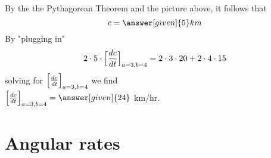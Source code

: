 \documentclass{ximera}
\begin{document}
\begin{example}
\begin{explanation}
\begin{image}
\end{image}
By the the Pythagorean Theorem and the picture above, it follows that
\[
c = \answer[given]{5}  km
\]
By  "plugging in" 
\[
2\cdot 5 \cdot \Bigl[\frac{dc}{dt}\Bigr]_{a=3, b=4} = 2 \cdot 3\cdot 20 + 2 \cdot 4 \cdot 15
\]
solving for $\Bigl[\frac{dc}{dt}\Bigr]_{a=3, b=4}$ we find\\

 $\Bigl[\frac{dc}{dt}\Bigr]_{a=3, b=4} = \answer[given]{24}$ km/hr.
\end{explanation}
\end{example}



\section{Angular rates}
\end{document}
